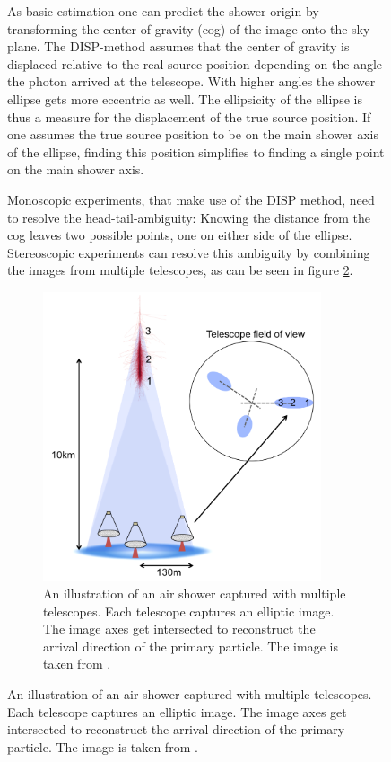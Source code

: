 \begin{figure}
As basic estimation one can predict the shower origin by 
transforming the center of gravity (cog) of the image onto the sky plane.
The DISP-method assumes that the 
center of gravity is displaced relative to the
real source position depending on the angle the photon arrived at the telescope.
With higher angles the shower ellipse gets more eccentric as well.
The ellipsicity of the ellipse is thus a measure for the displacement of the true 
source position.
If one assumes the true source position to be on the main shower axis of the ellipse,
finding this position simplifies to finding a single point on the main shower axis.

Monoscopic experiments, that make use of the DISP method, need to resolve the head-tail-ambiguity:
Knowing the distance from the cog leaves two possible points, one on either side 
of the ellipse.
Stereoscopic experiments can resolve this ambiguity by combining the images from 
multiple telescopes, as can be seen in figure \ref{fig:stereo_shower}.

\begin{figure}
	\centering
	\captionsetup{width=0.9\linewidth}
	\hspace*{0.1\textwidth}\includegraphics[width=0.9\textwidth]{images/stereo_shower.png}
	\caption{An illustration of an air shower captured with multiple telescopes.
		Each telescope captures an elliptic image.
		The image axes get intersected to reconstruct the arrival direction
		of the primary particle.
	    The image is taken from \cite{2015arXiv151005675H}.}
	\label{fig:stereo_shower}
\end{figure}




\end{figure}
